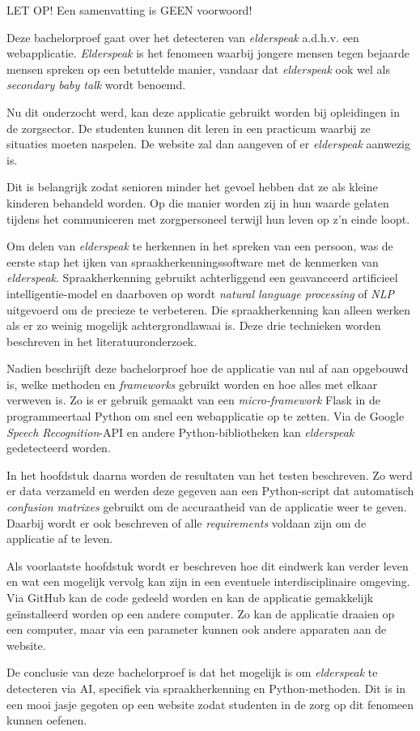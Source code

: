 LET OP! Een samenvatting is GEEN voorwoord!

\color{black}
Deze bachelorproef gaat over het detecteren van \textit{elderspeak} a.d.h.v. een webapplicatie. \textit{Elderspeak} is het fenomeen waarbij jongere mensen tegen bejaarde mensen spreken op een betuttelde manier,  vandaar dat \textit{elderspeak} ook wel als \textit{secondary baby talk} wordt benoemd.

Nu dit onderzocht werd, kan deze applicatie gebruikt worden bij opleidingen in de zorgsector. De studenten kunnen dit leren in een practicum waarbij ze situaties moeten naspelen. De website zal dan aangeven of er \textit{elderspeak} aanwezig is.

Dit is belangrijk zodat senioren minder het gevoel hebben dat ze als kleine kinderen behandeld worden. Op die manier worden zij in hun waarde gelaten tijdens het communiceren met zorgpersoneel terwijl hun leven op z’n einde loopt.

Om delen van \textit{elderspeak} te herkennen in het spreken van een persoon, was de eerste stap het ijken van spraakherkenningssoftware met de kenmerken van \textit{elderspeak}. Spraakherkenning gebruikt achterliggend een geavanceerd artificieel intelligentie-model en daarboven op wordt \textit{natural language processing} of \textit{NLP} uitgevoerd om de precieze te verbeteren. Die spraakherkenning kan alleen werken als er zo weinig mogelijk achtergrondlawaai is. Deze drie technieken worden beschreven in het literatuuronderzoek.

Nadien beschrijft deze bachelorproef hoe de applicatie van nul af aan opgebouwd is, welke methoden en \textit{frameworks} gebruikt worden en hoe alles met elkaar verweven is. Zo is er gebruik gemaakt van een \textit{micro-framework} Flask in de programmeertaal Python om snel een webapplicatie op te zetten. Via de Google \textit{Speech Recognition}-API en andere Python-bibliotheken kan \textit{elderspeak} gedetecteerd worden.

In het hoofdstuk daarna worden de resultaten van het testen beschreven. Zo werd er data verzameld en werden deze gegeven aan een Python-script dat automatisch \textit{confusion matrixes} gebruikt om de accuraatheid van de applicatie weer te geven. Daarbij wordt er ook beschreven of alle \textit{requirements} voldaan zijn om de applicatie af te leven.

Als voorlaatste hoofdstuk wordt er beschreven hoe dit eindwerk kan verder leven en wat een mogelijk vervolg kan zijn in een eventuele interdisciplinaire omgeving. Via GitHub kan de code gedeeld worden en kan de applicatie gemakkelijk geïnstalleerd worden op een andere computer. Zo kan de applicatie draaien op een computer, maar via een parameter kunnen ook andere apparaten aan de website.

De conclusie van deze bachelorproef is dat het mogelijk is om \textit{elderspeak} te detecteren via AI, specifiek via spraakherkenning en Python-methoden. Dit is in een mooi jasje gegoten op een website zodat studenten in de zorg op dit fenomeen kunnen oefenen.

